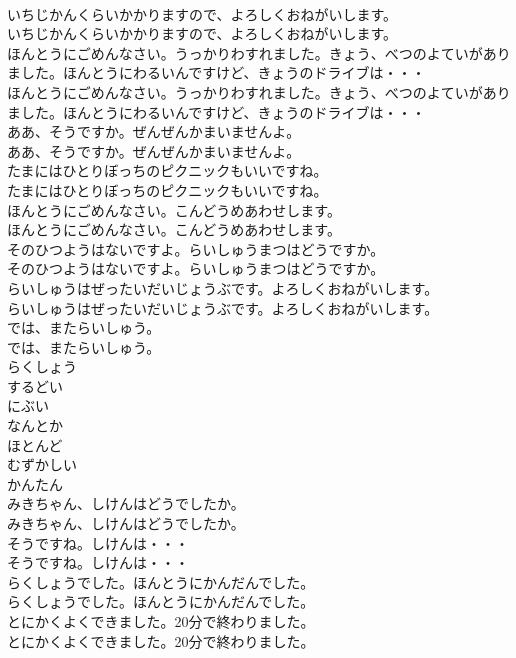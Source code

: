 \documentclass[8pt]{extreport}
\begin{document}
\begin{CJK}{UTF8}{min}
\\	いちじかんくらいかかりますので、よろしくおねがいします。	
\\	いちじかんくらいかかりますので、よろしくおねがいします。 
\\	ほんとうにごめんなさい。うっかりわすれました。きょう、べつのよていがありました。ほんとうにわるいんですけど、きょうのドライブは・・・	
\\	ほんとうにごめんなさい。うっかりわすれました。きょう、べつのよていがありました。ほんとうにわるいんですけど、きょうのドライブは・・・ 
\\	ああ、そうですか。ぜんぜんかまいませんよ。	
\\	ああ、そうですか。ぜんぜんかまいませんよ。 
\\	たまにはひとりぼっちのピクニックもいいですね。	
\\	たまにはひとりぼっちのピクニックもいいですね。 
\\	ほんとうにごめんなさい。こんどうめあわせします。	
\\	ほんとうにごめんなさい。こんどうめあわせします。 
\\	そのひつようはないですよ。らいしゅうまつはどうですか。	
\\	そのひつようはないですよ。らいしゅうまつはどうですか。 
\\	らいしゅうはぜったいだいじょうぶです。よろしくおねがいします。	
\\	らいしゅうはぜったいだいじょうぶです。よろしくおねがいします。 
\\	では、またらいしゅう。	
\\	では、またらいしゅう。 
\\	らくしょう
\\	するどい
\\	にぶい
\\	なんとか
\\	ほとんど
\\	むずかしい
\\	かんたん
\\	みきちゃん、しけんはどうでしたか。	
\\	みきちゃん、しけんはどうでしたか。 
\\	そうですね。しけんは・・・	
\\	そうですね。しけんは・・・ 
\\	らくしょうでした。ほんとうにかんだんでした。	
\\	らくしょうでした。ほんとうにかんだんでした。 
\\	とにかくよくできました。20分で終わりました。	
\\	とにかくよくできました。20分で終わりました。 

\end{CJK}
\end{document}
